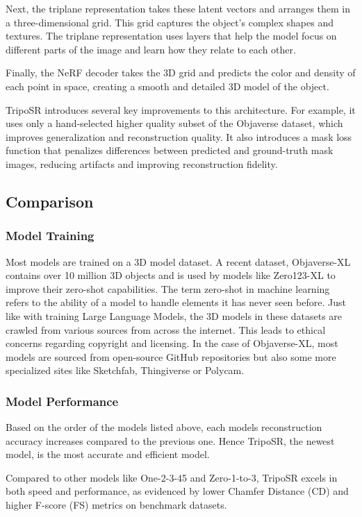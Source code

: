 Next, the triplane representation takes these latent vectors and arranges them in a three-dimensional grid. This grid captures the object's complex shapes and textures. The triplane representation uses layers that help the model focus on different parts of the image and learn how they relate to each other.

Finally, the NeRF decoder takes the 3D grid and predicts the color and density of each point in space, creating a smooth and detailed 3D model of the object.

TripoSR introduces several key improvements to this architecture. For example, it uses only a hand-selected higher quality subset of the Objaverse dataset, which improves generalization and reconstruction quality. It also introduces a mask loss function that penalizes differences between predicted and ground-truth mask images, reducing artifacts and improving reconstruction fidelity.

\subsection{Comparison}

\subsubsection{Model Training}
Most models are trained on a 3D model dataset. A recent dataset, Objaverse-XL \autocite{deitke_objaverse-xl_2023} contains over 10 million 3D objects and is used by models like Zero123-XL to improve their zero-shot capabilities.
The term zero-shot in machine learning refers to the ability of a model to handle elements it has never seen before.
Just like with training Large Language Models, the 3D models in these datasets are crawled from various sources from across the internet.
This leads to ethical concerns regarding copyright and licensing.
In the case of Objaverse-XL, most models are sourced from open-source GitHub repositories but also some more specialized sites like Sketchfab, Thingiverse or Polycam.

\subsubsection{Model Performance}
Based on the order of the models listed above, each models reconstruction accuracy increases compared to the previous one.
Hence TripoSR, the newest model, is the most accurate and efficient model.

Compared to other models like One-2-3-45 and Zero-1-to-3, TripoSR excels in both speed and performance, as evidenced by lower Chamfer Distance (CD) and higher F-score (FS) metrics on benchmark datasets.

